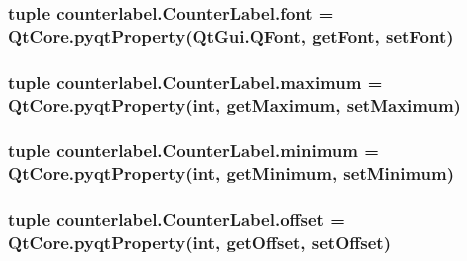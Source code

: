 \subsubsection[{font}]{\setlength{\rightskip}{0pt plus 5cm}tuple counterlabel.\+Counter\+Label.\+font = Qt\+Core.\+pyqt\+Property(Qt\+Gui.\+Q\+Font, {\bf get\+Font}, {\bf set\+Font})\hspace{0.3cm}{\ttfamily [static]}}\label{classcounterlabel_1_1CounterLabel_a9d7a72240db94ecae027781e1d87bde4}
\hypertarget{classcounterlabel_1_1CounterLabel_a86267d46fdd529d06c52de9766af21e9}{}
\subsubsection[{maximum}]{\setlength{\rightskip}{0pt plus 5cm}tuple counterlabel.\+Counter\+Label.\+maximum = Qt\+Core.\+pyqt\+Property(int, {\bf get\+Maximum}, {\bf set\+Maximum})\hspace{0.3cm}{\ttfamily [static]}}\label{classcounterlabel_1_1CounterLabel_a86267d46fdd529d06c52de9766af21e9}
\hypertarget{classcounterlabel_1_1CounterLabel_a8739036557ffdbdd559a65a400d4684c}{}
\subsubsection[{minimum}]{\setlength{\rightskip}{0pt plus 5cm}tuple counterlabel.\+Counter\+Label.\+minimum = Qt\+Core.\+pyqt\+Property(int, {\bf get\+Minimum}, {\bf set\+Minimum})\hspace{0.3cm}{\ttfamily [static]}}\label{classcounterlabel_1_1CounterLabel_a8739036557ffdbdd559a65a400d4684c}
\hypertarget{classcounterlabel_1_1CounterLabel_a0ded2704ed0052e09c70b762a3b306e9}{}
\subsubsection[{offset}]{\setlength{\rightskip}{0pt plus 5cm}tuple counterlabel.\+Counter\+Label.\+offset = Qt\+Core.\+pyqt\+Property(int, {\bf get\+Offset}, {\bf set\+Offset})\hspace{0.3cm}{\ttfamily [static]}}\label{classcounterlabel_1_1CounterLabel_a0ded2704ed0052e09c70b762a3b306e9}
\hypertarget{classcounterlabel_1_1CounterLabel_ad01646565864a58c8217eb5637ec625f}{}
